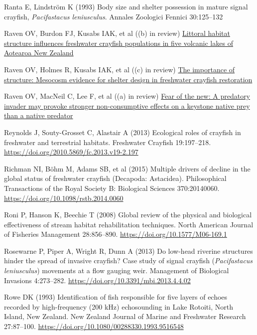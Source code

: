\documentclass[
  12pt,
  a4paper,
]{scrbook}
\newlength{\cslhangindent}
\newenvironment{CSLReferences}[2] %
 {\begin{list}{}{%
  \setlength{\itemindent}{0pt}
  \setlength{\leftmargin}{0pt}
  \setlength{\parsep}{0pt}
  \ifodd #1
   \setlength{\leftmargin}{\cslhangindent}
   \setlength{\itemindent}{-1\cslhangindent}
  \fi
  \setlength{\itemsep}{#2\baselineskip}}}
 {\end{list}}
\begin{document}
\begin{CSLReferences}{1}{1}
Ranta E, Lindström K (1993) Body size and shelter possession in mature
signal crayfish, {\emph{Pacifastacus leniusculus}}. Annales Zoologici
Fennici 30:125--132

Raven OV, Burdon FJ, Kusabs IAK, et al ((b) in review)
\href{https://olivierraven.github.io/Koura_shoreline_habitats/}{Littoral
habitat structure influences freshwater crayfish populations in five
volcanic lakes of {Aotearoa New Zealand}}

Raven OV, Holmes R, Kusabs IAK, et al ((c) in review)
\href{https://olivierraven.github.io/Koura_Mesocosm/}{The importance of
structure: Mesocosm evidence for shelter design in freshwater crayfish
restoration}

Raven OV, MacNeil C, Lee F, et al ((a) in review)
\href{https://olivierraven.github.io/NCE_Koura_catfish/}{Fear of the
new: A predatory invader may provoke stronger non-consumptive effects on
a keystone native prey than a native predator}

Reynolds J, Souty-Grosset C, Alastair A (2013) Ecological roles of
crayfish in freshwater and terrestrial habitats. Freshwater Crayfish
19:197--218. \url{https://doi.org/2010.5869/fc.2013.v19-2.197}

Richman NI, Böhm M, Adams SB, et al (2015) Multiple drivers of decline
in the global status of freshwater crayfish ({Decapoda}: {Astacidea}).
Philosophical Transactions of the Royal Society B: Biological Sciences
370:20140060. \url{https://doi.org/10.1098/rstb.2014.0060}

Roni P, Hanson K, Beechie T (2008) Global review of the physical and
biological effectiveness of stream habitat rehabilitation techniques.
North American Journal of Fisheries Management 28:856--890.
\url{https://doi.org/10.1577/M06-169.1}

Rosewarne P, Piper A, Wright R, Dunn A (2013) Do low-head riverine
structures hinder the spread of invasive crayfish? Case study of signal
crayfish ({\emph{Pacifastacus leniusculus}}) movements at a flow gauging
weir. Management of Biological Invasions 4:273--282.
\url{https://doi.org/10.3391/mbi.2013.4.4.02}

Rowe DK (1993) Identification of fish responsible for five layers of
echoes recorded by high-frequency (200 kHz) echosounding in {Lake
Rotoiti}, {North Island, New Zealand}. New Zealand Journal of Marine and
Freshwater Research 27:87--100.
\url{https://doi.org/10.1080/00288330.1993.9516548}


\end{CSLReferences}
\end{document}
